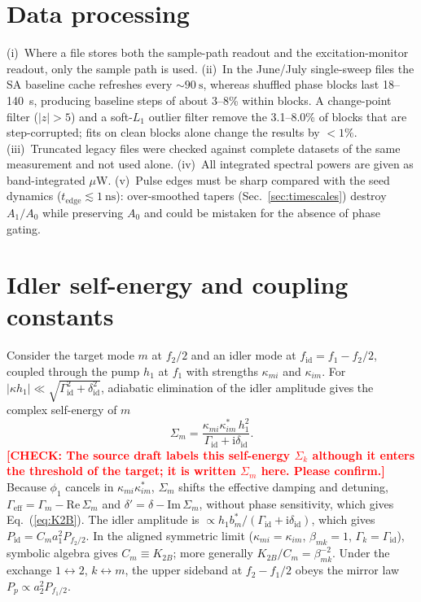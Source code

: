 \documentclass[aps,prb,reprint,superscriptaddress,floatfix]{revtex4-2}
\newcommand{\chk}[1]{\textcolor{red}{\textbf{[CHECK: #1]}}}
\newcommand{\chk}[1]{}
\newcommand{\ii}{\mathrm{i}}
\begin{document}
\section{Data processing}\label{app:data}

(i)~Where a file stores both the sample-path readout and the excitation-monitor readout, only the sample path is used. (ii)~In the June/July single-sweep files the SA baseline cache refreshes every $\sim\SI{90}{\second}$, whereas shuffled phase blocks last 18--\SI{140}{\second}, producing baseline steps of about 3--8\% within blocks. A change-point filter ($|z|>5$) and a soft-$L_1$ outlier filter remove the 3.1--8.0\% of blocks that are step-corrupted; fits on clean blocks alone change the results by $<1\%$. (iii)~Truncated legacy files were checked against complete datasets of the same measurement and not used alone. (iv)~All integrated spectral powers are given as band-integrated $\mu$W. (v)~Pulse edges must be sharp compared with the seed dynamics ($t_{\mathrm{edge}}\lesssim\SI{1}{\nano\second}$): over-smoothed tapers (Sec.~\ref{sec:timescales}) destroy $A_1/A_0$ while preserving $A_0$ and could be mistaken for the absence of phase gating.

\section{Idler self-energy and coupling constants}\label{app:idler}

Consider the target mode $m$ at $f_2/2$ and an idler mode at $f_{\mathrm{id}}=f_1-f_2/2$, coupled through the pump $h_1$ at $f_1$ with strengths $\kappa_{mi}$ and $\kappa_{im}$. For $|\kappa h_1|\ll\sqrt{\Gamma_{\mathrm{id}}^2+\delta_{\mathrm{id}}^2}$, adiabatic elimination of the idler amplitude gives the complex self-energy of $m$
\begin{equation}
\Sigma_m=\frac{\kappa_{mi}\kappa_{im}^*\,h_1^2}{\Gamma_{\mathrm{id}}+\ii\delta_{\mathrm{id}}} .
\end{equation}
\chk{The source draft labels this self-energy $\Sigma_k$ although it enters the threshold of the target; it is written $\Sigma_m$ here. Please confirm.}
Because $\phi_1$ cancels in $\kappa_{mi}\kappa_{im}^*$, $\Sigma_m$ shifts the effective damping and detuning, $\Gamma_{\mathrm{eff}}=\Gamma_m-\mathrm{Re}\,\Sigma_m$ and $\delta'=\delta-\mathrm{Im}\,\Sigma_m$, without phase sensitivity, which gives Eq.~(\ref{eq:K2B}). The idler amplitude is $\propto h_1b_m^*/(\Gamma_{\mathrm{id}}+\ii\delta_{\mathrm{id}})$, which gives $P_{\mathrm{id}}=C_ma_1^2P_{f_2/2}$. In the aligned symmetric limit ($\kappa_{mi}=\kappa_{im}$, $\beta_{mk}=1$, $\Gamma_k=\Gamma_{\mathrm{id}}$), symbolic algebra gives $C_m\equiv K_{2B}$; more generally $K_{2B}/C_m=\beta_{mk}^{-2}$. Under the exchange $1\leftrightarrow2$, $k\leftrightarrow m$, the upper sideband at $f_2-f_1/2$ obeys the mirror law $P_p\propto a_2^2P_{f_1/2}$.
\end{document}
